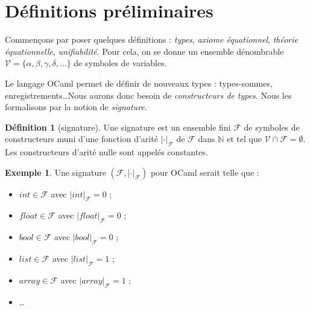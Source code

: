 \documentclass[a4paper]{report}
\theoremstyle{definition}
\newtheorem{definition}[theoreme]{Définition}
\newtheorem{exemple}[theoreme]{Exemple}
\newcommand{\V}{\mathscr{V}}
\newcommand{\F}{\mathscr{F}}
\begin{document}


\section{Définitions préliminaires}

Commençons par poser quelques définitions : \emph{types}, \emph{axiome équationnel}, \emph{théorie équationnelle}, \emph{unifiabilité}. Pour cela, on se donne un ensemble dénombrable $\V = \{ \alpha, \beta, \gamma, \delta, \dots \}$ de symboles de variables.

Le langage OCaml permet de définir de nouveaux types : types-sommes, enregistrements\ldots Nous aurons donc besoin de \emph{constructeurs de types}. Nous les formalisons par la notion de \emph{signature}.

\begin{definition}[signature]
	Une signature est un ensemble fini $\F$ de symboles de constructeurs muni d'une fonction d'arité $| \cdot |_\F$ de $\F$ dans $\mathbb{N}$ et tel que $\V \cap \F = \emptyset$. Les constructeurs d'arité nulle sont appelés constantes.
\end{definition}

\begin{exemple}
	Une signature $( \F, | \cdot |_\F )$ pour OCaml serait telle que :
	\begin{itemize}
		\item $int \in \F$ avec $| int |_\F = 0$ ;
		\item $float \in \F$ avec $| float |_\F = 0$ ;
		\item $bool \in \F$ avec $| bool |_\F = 0$ ;
		\item $list \in \F$ avec $| list |_\F = 1$ ;
		\item $array \in \F$ avec $| array |_\F = 1$ ;
		\item \dots
	\end{itemize}
\end{exemple}


\end{document}

